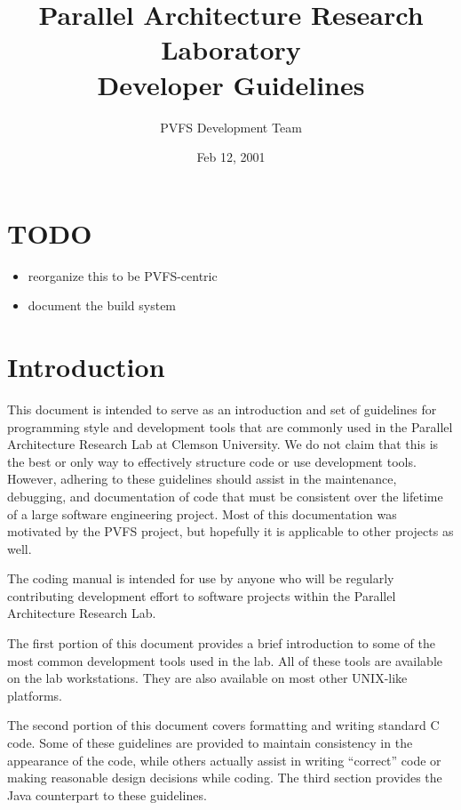 \documentclass[11pt, letterpaper]{article}
\title{Parallel Architecture Research Laboratory\\Developer Guidelines}
\author{ PVFS Development Team }
\date{ Feb 12, 2001 }
\begin{document}
\maketitle

\tableofcontents

\newpage

\thispagestyle{plain}


\section{TODO}
\begin{itemize}
\item reorganize this to be PVFS-centric
\item document the build system
\end{itemize}

\section{Introduction}

This document is intended to serve as an introduction and set of
guidelines for programming style and development tools that are commonly
used in the Parallel Architecture Research Lab at Clemson University.
We do not claim that this
is the best or only way to effectively structure code or use development
tools.  However, adhering to these guidelines should assist in the
maintenance, debugging, and documentation of code that must be
consistent over the lifetime of a large software engineering project.
Most of this documentation was motivated by the PVFS project, but
hopefully it is applicable to other projects as well.

The coding manual is intended for use by anyone who will be regularly
contributing development effort to software projects within the Parallel
Architecture Research Lab.

The first portion of this document provides a brief introduction to
some of the most common development tools used in the lab.  All of
these tools are available on the lab workstations.  They are also
available on most other UNIX-like platforms.  

The second portion of this document covers formatting and writing
standard C code.  Some of these guidelines are provided to maintain consistency in
the appearance of the code, while others actually assist in writing
``correct'' code or making reasonable design decisions while coding.
The third section provides the Java counterpart to these guidelines.
\end{document}
